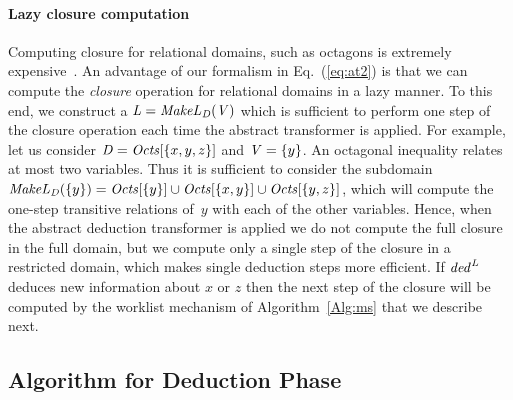 \paragraph {\textbf{Lazy closure computation}} 
Computing closure for relational domains, such as octagons is extremely
expensive~\cite{pldi15}.  An advantage of our formalism in 
Eq.~(\ref{eq:at2}) is that we can compute the
\emph{closure} operation for relational domains in a lazy manner. To
this end, we construct a $\mathit{L}=\mathit{MakeL}_{\mathit{D}}(\mathit{V})$
which is sufficient to perform one step of the closure operation each
time the abstract transformer is applied.
%
For example, let us consider $\mathit{D}=\mathit{Octs}[\{x,y,z\}]$ and
$\mathit{V}=\{y\}$. An octagonal inequality relates at 
most two variables. Thus it is sufficient to consider the subdomain
$\mathit{MakeL}_{\mathit{D}}(\{y\})=\mathit{Octs}[\{y\}]\cup\mathit{Octs}[\{x,y\}]\cup\mathit{Octs}[\{y,z\}]$,
which will compute the one-step transitive relations of~$y$ with each
of the other variables. 
%
Hence, when the abstract deduction transformer is applied we do not
compute the full closure in the full domain,
but we compute only a single step of the closure in a restricted
domain, which makes single deduction steps more efficient.
%
If $\mathit{ded}^{\mathit{L}}$ deduces new information about $x$ or $z$
then the next step of the closure will be computed by the worklist
mechanism of Algorithm~\ref{Alg:ms} that we describe next.




\subsection{Algorithm for Deduction Phase}
%

